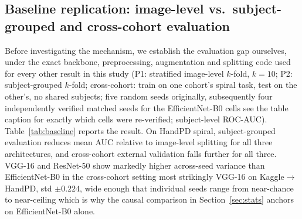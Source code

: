 \documentclass[3p,final,10pt]{elsarticle}
\let\oldsubsection\subsection
\renewcommand{\subsection}{\FloatBarrier\oldsubsection}
\begin{document}
\subsection{Baseline replication: image-level vs.\ subject-grouped and cross-cohort evaluation}
\label{sec:baseline}
Before investigating the mechanism, we establish the evaluation gap
ourselves, under the exact backbone, preprocessing, augmentation and
splitting code used for every other result in this study (P1: stratified
image-level $k$-fold, $k{=}10$; P2: subject-grouped $k$-fold; cross-cohort:
train on one cohort's spiral task, test on the other's, no shared
subjects; five random seeds originally, subsequently four independently
verified matched seeds for the EfficientNet-B0 cells see the table
caption for exactly which cells were re-verified; subject-level ROC-AUC).
Table~\ref{tab:baseline}
reports the result. On HandPD spiral, subject-grouped evaluation reduces
mean AUC relative to image-level splitting for all three architectures, and
cross-cohort external validation falls further for all three. VGG-16 and
ResNet-50 show markedly higher across-seed variance than EfficientNet-B0 in
the cross-cohort setting most strikingly VGG-16 on Kaggle$\to$HandPD,
std $\pm0.224$, wide enough that individual seeds range from near-chance to
near-ceiling which is why the causal comparison in
Section~\ref{sec:stats} anchors on EfficientNet-B0 alone.
\end{document}
